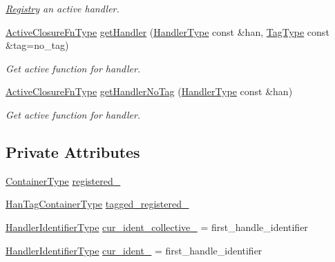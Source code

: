\begin{DoxyCompactItemize}
\begin{DoxyCompactList}\small\item\em \hyperlink{structvt_1_1registry_1_1_registry}{Registry} an active handler. \end{DoxyCompactList}\item 
\hyperlink{namespacevt_a2a06c34cafcd511828f16cbf1476b924}{Active\+Closure\+Fn\+Type} \hyperlink{structvt_1_1registry_1_1_registry_a7ed0804483b7a1816b8b05429668f6c9}{get\+Handler} (\hyperlink{namespacevt_af64846b57dfcaf104da3ef6967917573}{Handler\+Type} const \&han, \hyperlink{namespacevt_a84ab281dae04a52a4b243d6bf62d0e52}{Tag\+Type} const \&tag=no\+\_\+tag)
\begin{DoxyCompactList}\small\item\em Get active function for handler. \end{DoxyCompactList}\item 
\hyperlink{namespacevt_a2a06c34cafcd511828f16cbf1476b924}{Active\+Closure\+Fn\+Type} \hyperlink{structvt_1_1registry_1_1_registry_ae258a38c9a8237c900ecd40f3a4328d9}{get\+Handler\+No\+Tag} (\hyperlink{namespacevt_af64846b57dfcaf104da3ef6967917573}{Handler\+Type} const \&han)
\begin{DoxyCompactList}\small\item\em Get active function for handler. \end{DoxyCompactList}\end{DoxyCompactItemize}
\subsection*{Private Attributes}
\begin{DoxyCompactItemize}
\item 
\hyperlink{structvt_1_1registry_1_1_registry_ac9e1297d26b6c553ccdaa46858cdb3b8}{Container\+Type} \hyperlink{structvt_1_1registry_1_1_registry_adb3e36c663839801759d6bd264b8c4b5}{registered\+\_\+}
\item 
\hyperlink{structvt_1_1registry_1_1_registry_ab5d336044aee749d39c8feabe4fa6983}{Han\+Tag\+Container\+Type} \hyperlink{structvt_1_1registry_1_1_registry_ad7d3a1810876242414c29c24db82bb6c}{tagged\+\_\+registered\+\_\+}
\item 
\hyperlink{namespacevt_a59ae068fe828d1c33051ff96f3d016b6}{Handler\+Identifier\+Type} \hyperlink{structvt_1_1registry_1_1_registry_afbdfcfbd2a8c30820545587e1650fb20}{cur\+\_\+ident\+\_\+collective\+\_\+} = first\+\_\+handle\+\_\+identifier
\item 
\hyperlink{namespacevt_a59ae068fe828d1c33051ff96f3d016b6}{Handler\+Identifier\+Type} \hyperlink{structvt_1_1registry_1_1_registry_a8aed0f506143750c8444f7b6660be1c5}{cur\+\_\+ident\+\_\+} = first\+\_\+handle\+\_\+identifier
\end{DoxyCompactItemize}
